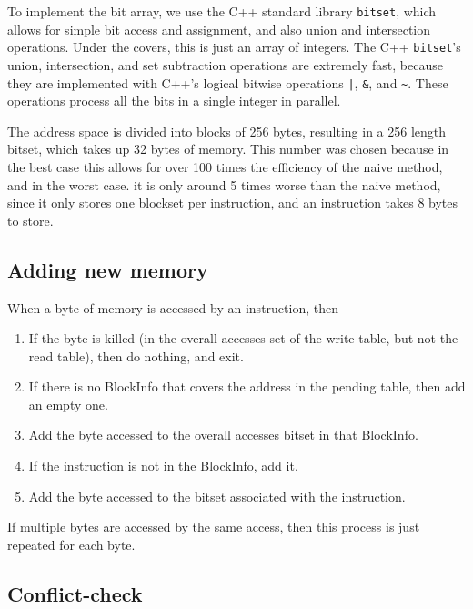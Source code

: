 \documentclass[12pt,twoside]{reedthesis}
\begin{document}
			To implement the bit array, we use the C++ standard library \texttt{bitset}, which allows for simple bit access and assignment, and also union and intersection operations. Under the covers, this is just an array of integers. The C++ \texttt{bitset}'s union, intersection, and set subtraction operations are extremely fast, because they are implemented with C++'s logical bitwise operations \texttt{|}, \texttt{\&}, and \texttt{\~}. These operations process all the bits in a single integer in parallel. 
			
			The address space is divided into blocks of 256 bytes, resulting in a 256 length bitset, which takes up 32 bytes of memory. This number was chosen because in the best case this allows for over 100 times the efficiency of the naive method, and in the worst case. it is only around 5 times worse than the naive method, since it only stores one blockset per instruction, and an instruction takes 8 bytes to store. 
			
			\subsection{Adding new memory}
			
			When a byte of memory is accessed by an instruction, then
			
			\begin{enumerate}
				\item If the byte is killed (in the overall accesses set of the write table, but not the read table), then do nothing, and exit.  
				\item If there is no BlockInfo that covers the address in the pending table, then add an empty one. 
				\item Add the byte accessed to the overall accesses bitset in that BlockInfo.
				\item If the instruction is not in the BlockInfo, add it.
				\item Add the byte accessed to the bitset associated with the instruction.
			\end{enumerate}
			
			If multiple bytes are accessed by the same access, then this process is just repeated for each byte. 
			
			
			\subsection{Conflict-check}
			
\end{document}

